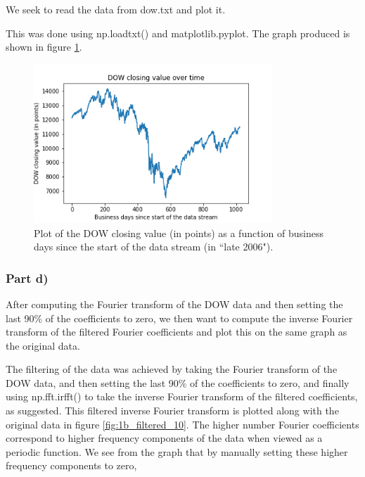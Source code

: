 \documentclass{article}
\begin{document}
We seek to read the data from dow.txt and plot it.

This was done using np.loadtxt() and matplotlib.pyplot. The graph produced is shown in figure \ref{fig:1b_dow}.

\begin{figure}[H]
	\centering
	\includegraphics[width=0.8\textwidth]{../images/1b_dow.png}
	\caption{Plot of the DOW closing value (in points) as a function of business days since the start of the data stream (in ``late 2006").}
	\label{fig:1b_dow}
\end{figure}

\subsubsection{Part d)}

After computing the Fourier transform of the DOW data and then setting the last 90\% of the coefficients to zero, we then want to compute the inverse Fourier transform of the filtered Fourier coefficients and plot this on the same graph as the original data.

The filtering of the data was achieved by taking the Fourier transform of the DOW data, and then setting the last 90\% of the coefficients to zero, and finally using np.fft.irfft() to take the inverse Fourier transform of the filtered coefficients, as suggested. This filtered inverse Fourier transform is plotted along with the original data in figure \ref{fig:1b_filtered_10}. The higher number Fourier coefficients correspond to higher frequency components of the data when viewed as a periodic function. We see from the graph that by manually setting these higher frequency components to zero, 
\end{document}
